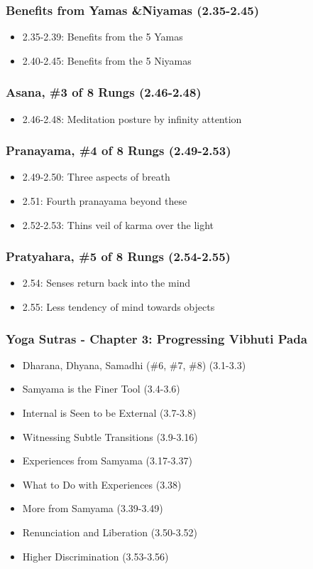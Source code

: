 \begin{frame}[fragile]\frametitle{Benefits from Yamas \&Niyamas (2.35-2.45)}
\begin{itemize}
\item 2.35-2.39: Benefits from the 5 Yamas
\item 2.40-2.45: Benefits from the 5 Niyamas
\end{itemize}
\end{frame}

\begin{frame}[fragile]\frametitle{Asana, \#3 of 8 Rungs (2.46-2.48)}
\begin{itemize}
\item 2.46-2.48: Meditation posture by infinity attention
\end{itemize}
\end{frame}

\begin{frame}[fragile]\frametitle{Pranayama, \#4 of 8 Rungs (2.49-2.53)} 
\begin{itemize}
\item 2.49-2.50: Three aspects of breath
\item 2.51: Fourth pranayama beyond these
\item 2.52-2.53: Thins veil of karma over the light
\end{itemize}
\end{frame}

\begin{frame}[fragile]\frametitle{Pratyahara, \#5 of 8 Rungs (2.54-2.55)}
\begin{itemize}
\item 2.54: Senses return back into the mind
\item 2.55: Less tendency of mind towards objects 
\end{itemize}
\end{frame}

\begin{frame}[fragile]\frametitle{Yoga Sutras - Chapter 3: Progressing Vibhuti Pada}
\begin{itemize}
\item Dharana, Dhyana, Samadhi (\#6, \#7, \#8) (3.1-3.3)
\item Samyama is the Finer Tool (3.4-3.6)
\item Internal is Seen to be External (3.7-3.8)
\item Witnessing Subtle Transitions (3.9-3.16)
\item Experiences from Samyama (3.17-3.37)
\item What to Do with Experiences (3.38)
\item More from Samyama (3.39-3.49)
\item Renunciation and Liberation (3.50-3.52)
\item Higher Discrimination (3.53-3.56)
\end{itemize}
\end{frame}

